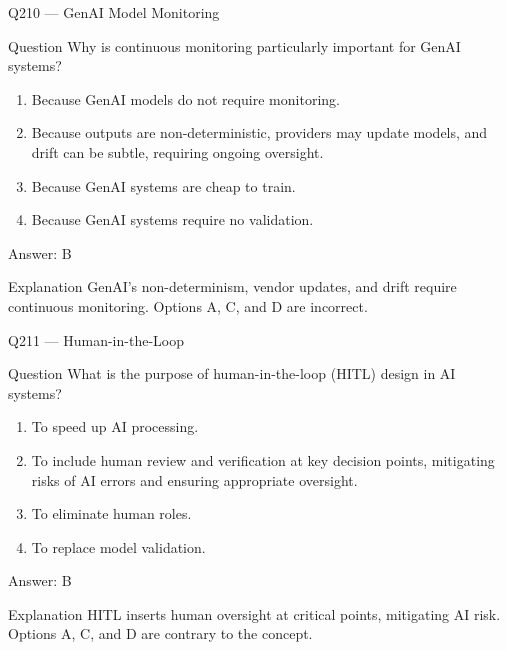 \documentclass[aspectratio=169,8pt]{beamer}
\begin{document}
																	\begin{frame}{Q210 --- GenAI Model Monitoring}
																		\begin{block}{Question}
																			Why is continuous monitoring particularly important for GenAI systems?
																			\begin{enumerate}
																				\item Because GenAI models do not require monitoring.
																				\item Because outputs are non-deterministic, providers may update models, and drift can be subtle, requiring ongoing oversight.
																				\item Because GenAI systems are cheap to train.
																				\item Because GenAI systems require no validation.
																			\end{enumerate}  \end{block}
																			\begin{exampleblock}{Answer: B}\end{exampleblock}
																			\begin{block}{Explanation}
																				GenAI's non-determinism, vendor updates, and drift require continuous monitoring. Options A, C, and D are incorrect.
																			\end{block}
																		\end{frame}
																		
																		\begin{frame}{Q211 --- Human-in-the-Loop}
																			\begin{block}{Question}
																				What is the purpose of human-in-the-loop (HITL) design in AI systems?
																				\begin{enumerate}
																					\item To speed up AI processing.
																					\item To include human review and verification at key decision points, mitigating risks of AI errors and ensuring appropriate oversight.
																					\item To eliminate human roles.
																					\item To replace model validation.
																				\end{enumerate}  \end{block}
																				\begin{exampleblock}{Answer: B}\end{exampleblock}
																				\begin{block}{Explanation}
																					HITL inserts human oversight at critical points, mitigating AI risk. Options A, C, and D are contrary to the concept.
																				\end{block}
																			\end{frame}
																			
\end{document}

